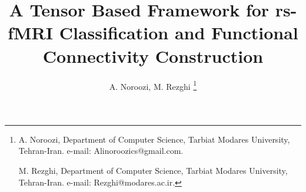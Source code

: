 \documentclass[journal]{IEEEtran}
\begin{document}
	\title{A Tensor Based Framework for rs-fMRI Classification and Functional Connectivity Construction} 
%	
	
	\author{A. Noroozi,
		M. Rezghi%
		\thanks{
			A. Noroozi, Department of Computer Science, Tarbiat Modares University,
			Tehran-Iran. e-mail: Alinoroozics@gmail.com.
			
			M. Rezghi, Department of Computer Science, Tarbiat Modares University,
			Tehran-Iran. e-mail: Rezghi@modares.ac.ir.
			}
	}
	
	
\end{document}
